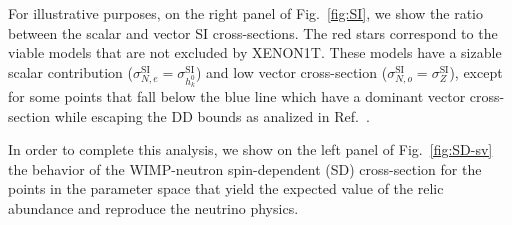 \documentclass[12pt,letterpaper]{article}
\begin{document}
For illustrative purposes, on the right panel of Fig.~\ref{fig:SI}, we show the ratio between the scalar and vector SI cross-sections. The red stars correspond to the viable models that are not excluded by XENON1T. These models have a sizable scalar contribution ($\sigma^{\text{SI}}_{N,e}=\sigma^{\text{SI}}_{h_k^0}$) and low vector cross-section ($\sigma^{\text{SI}}_{N,o}=\sigma^{\text{SI}}_{Z}$), except for some points that fall below the blue line which have a dominant vector cross-section while escaping the DD bounds as analized in Ref.~\cite{Yaguna:2015mva}. 

In order to complete this analysis, we show on the left panel of Fig.~\ref{fig:SD-sv} the behavior of the WIMP-neutron spin-dependent (SD) cross-section for the points in the parameter space that yield the expected value of the relic abundance and reproduce the neutrino physics. 
\end{document}
